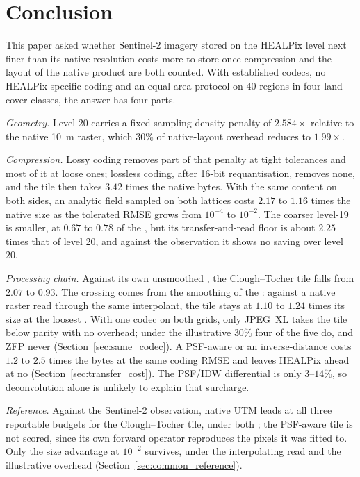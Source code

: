 \section{Conclusion}
\label{sec:conclusion}
This paper asked whether Sentinel-2 imagery stored on the HEALPix level
next finer than its native resolution costs more to store once
compression and the layout of the native product are both counted. With
established codecs, no HEALPix-specific coding and an equal-area
protocol on 40 regions in four land-cover classes, the answer has four
parts.

\emph{Geometry.} Level 20 carries a fixed sampling-density penalty of
$2.584\times$ relative to the native \SI{10}{m} raster, which $30\%$ of
native-layout overhead reduces to $1.99\times$.

\emph{Compression.} Lossy coding removes part of that penalty at tight
tolerances and most of it at loose ones; lossless coding, after 16-bit requantisation, removes none,
and the tile then takes $3.42$ times the native bytes. With the same
content on both sides, an analytic field sampled on both lattices costs
$2.17$ to $1.16$ times the native size as the tolerated RMSE grows from
$10^{-4}$ to $10^{-2}$. The coarser level-19  is smaller,
at $0.67$ to $0.78$ of the , but its transfer-and-read floor is about $2.25$ times that of level 20,
and against the observation it shows no saving over level 20.

\emph{Processing chain.} Against its own unsmoothed , the
Clough--Tocher tile falls from $2.07$ to $0.93$. The crossing comes from
the smoothing of the : against a native raster read
through the same interpolant, the tile stays at $1.10$ to $1.24$ times
its size at the loosest . With one codec on both grids, only JPEG~XL takes the tile below
parity with no overhead; under the illustrative $30\%$ four of the five
do, and ZFP never (Section~\ref{sec:same_codec}). A PSF-aware or an
inverse-distance  costs $1.2$ to $2.5$ times the bytes at
the same coding RMSE and leaves HEALPix ahead at no 
(Section~\ref{sec:transfer_cost}). The PSF/IDW differential is only
$3$--$14\%$, so deconvolution alone is unlikely to explain that
surcharge.

\emph{Reference.} Against the Sentinel-2 observation, native UTM leads
at all three reportable  budgets for the
Clough--Tocher tile, under both ; the PSF-aware tile is not
scored, since its own forward operator reproduces the pixels it was
fitted to. Only the size advantage at
$10^{-2}$ survives, under the interpolating read and the
illustrative overhead (Section~\ref{sec:common_reference}).

